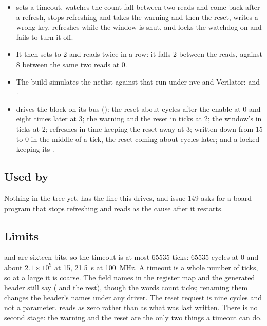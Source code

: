 \begin{itemize}
\item {} sets a timeout, watches the count
fall between two reads and come back after a refresh, stops refreshing
and takes the warning and then the reset, writes a wrong key, refreshes
while the window is shut, and locks the watchdog on and fails to turn
it off.
\item It then sets  to 2 and reads  twice in
a row: it falls 2 between the reads, against 8 between the same two
reads at  0.
\item The build simulates the netlist against that run under nvc and
Verilator:  and
.
\item {} drives the block on its bus
(): the reset about  cycles after the
enable at  0 and eight times later at 3; the warning and
the reset in ticks at 2; the window's  in ticks at 2;
refreshes in time keeping the reset away at 3;  written
down from 15 to 0 in the middle of a tick, the reset coming about
 cycles later; and a locked  keeping its
.
\end{itemize}

\subsection*{Used by}

Nothing in the tree yet.  has the  line this
drives, and issue 149 asks for a board program that stops refreshing
and reads  as the cause after it restarts.

\subsection*{Limits}

 and  are sixteen bits, so the timeout is at
most 65535 ticks: 65535 cycles at  0 and about $2.1 \times
10^9$ at 15, 21.5~s at 100~MHz. A timeout is a whole number of ticks,
so at a large  it is coarse. The field names in the
register map and the generated header still say 
( and the rest), though the words count
ticks; renaming them changes the header's names under any driver. The reset request is nine cycles and not a
parameter.  reads as zero rather than as what was last
written. There is no second stage: the warning and the reset are the
only two things a timeout can do.
